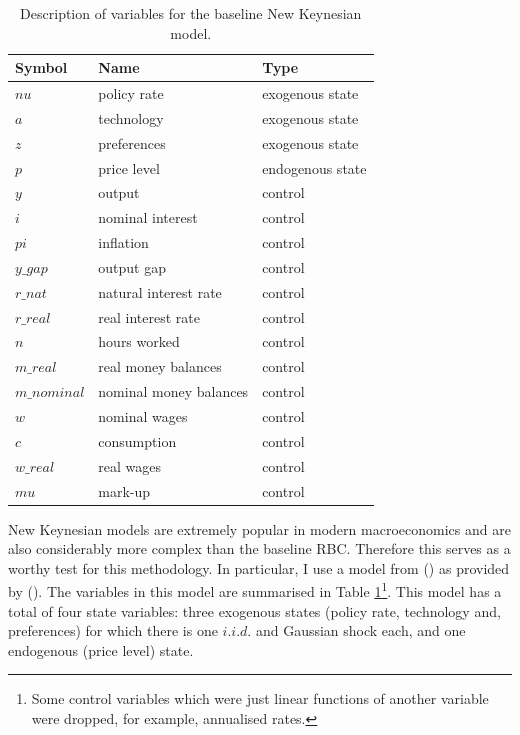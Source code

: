 \documentclass{article}
\begin{document}
\begin{table}
  \centering
  \begin{tabular}{|l|l|l|}
    \hline
    Symbol & Name & Type \\
    \hline
    $nu$ & policy rate & exogenous state \\
    $a$ & technology & exogenous state \\
    $z$ & preferences & exogenous state \\
    $p$ & price level & endogenous state \\
    $y$ & output & control \\
    $i$ & nominal interest & control \\
    $pi$ & inflation & control \\
    $y\_gap$ & output gap & control \\
    $r\_nat$ & natural interest rate & control \\
    $r\_real$ & real interest rate & control \\
    $n$ & hours worked & control \\
    $m\_real$ & real money balances & control \\
    $m\_nominal$ & nominal money balances & control \\
    $w$ & nominal wages & control \\ 
    $c$ & consumption & control \\
    $w\_real$ & real wages & control \\
    $mu$ & mark-up & control \\ \cline{2-2}
    \hline
  \end{tabular}
  \caption{Description of variables for the baseline New Keynesian model.}
  \label{nk_data}
\end{table}

New Keynesian models are extremely popular in modern macroeconomics and are also considerably more complex than the baseline RBC. Therefore this serves as a worthy test for this methodology. In particular, I use a model from \citeauthor{gali2015monetary} (\citeyear{gali2015monetary}) as provided by \citeauthor{pfeifer2020} (\citeyear{pfeifer2020}). The variables in this model are summarised in Table \ref{nk_data}\footnote{Some control variables which were just linear functions of another variable were dropped, for example, annualised rates.}. This model has a total of four state variables: three exogenous states (policy rate, technology and, preferences) for which there is one $i.i.d.$ and Gaussian shock each, and one endogenous (price level) state.
\end{document}
